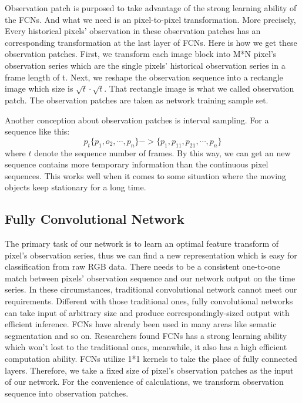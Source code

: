 \documentclass[journal]{IEEEtran}
\begin{document}
Observation patch is purposed to take advantage of the strong learning ability of the FCNs.
And what we need is an pixel-to-pixel transformation.
More precisely, Every historical pixels’ observation in these observation patches has an corresponding transformation  at the last layer of FCNs.
Here is how we get these observation patches.
First, we transform each image block into M*N pixel’s observation series which are the  single pixels’ historical observation series in a frame length of t.
Next, we reshape the observation sequence into a rectangle image which size is $\sqrt{t}\cdot \sqrt{t}$.
That rectangle image is what we called observation patch.
The observation patches are taken as network training sample set.

Another conception about observation patches is interval sampling.
For a sequence like this: 
\begin{equation}
    p_t\{p_1,o_2,\cdots,p_n\} -> \{p_1,p_{11},p_{21}, \cdots, p_n\}
\end{equation}
where $t$
denote the sequence number of frames.
By this way, we can get an new sequence contains more temporary information  than the continuous pixel sequences.
This works well when it comes to some situation where the moving objects keep stationary for a long time.


 
\subsection{Fully Convolutional Network}
\label{sec3_bc}
The primary task of our network is to learn an optimal feature transform of pixel’s observation series, thus we can find a new representation which is easy for classification from raw RGB data.
There needs to be a consistent one-to-one match between pixels’ observation sequence and our network output on the time series. In these circumstances, traditional convolutional network cannot meet our requirements. 
Different with those traditional ones, fully convolutional networks can take input of arbitrary size and produce correspondingly-sized output with efficient inference. 
FCNs have already been used in many areas like sematic segmentation and so on. Researchers found FCNs has a strong learning ability which won’t lost to the traditional ones, 
meanwhile, it also has a high efficient computation ability.   
FCNs utilize 1*1 kernels to take the place of fully connected layers. 
Therefore, we take a fixed size of pixel’s observation patches as the input of our network. For the convenience of calculations, we transform observation sequence into observation patches.
\end{document}

